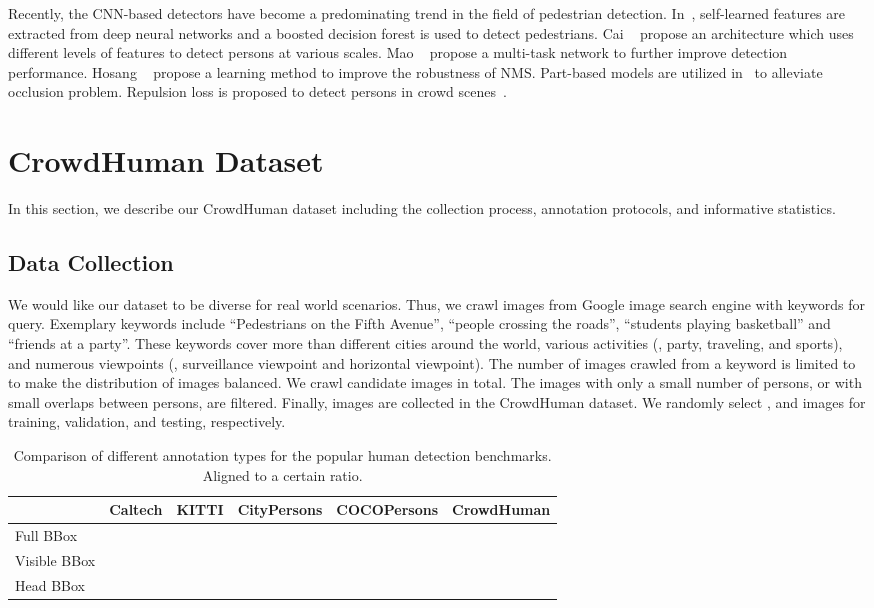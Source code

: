 \documentclass[10pt,twocolumn,letterpaper]{article}
\begin{document}
Recently, the CNN-based detectors have become a predominating trend in the field of pedestrian detection. In~\cite{zhang2016faster}, self-learned features are extracted from deep neural networks and a boosted decision forest is used to detect pedestrians. Cai \etal~\cite{cai2016unified} propose an architecture which uses different levels of features to detect persons at various scales. Mao \etal~\cite{mao2017can} propose a multi-task network to further improve detection performance. Hosang \etal~\cite{Hosang_2017_CVPR} propose a learning method to improve the robustness of NMS. Part-based models are utilized in~\cite{ouyang2012discriminative,zhou2017multi} to alleviate occlusion problem. Repulsion loss is proposed to detect persons in crowd scenes~\cite{wang2018Repulsion}.


\section{CrowdHuman Dataset}
\label{sec:dataset}
In this section, we describe our CrowdHuman dataset including the collection process, annotation protocols, and informative statistics.
\subsection{Data Collection}
We would like our dataset to be diverse for real world scenarios. Thus, we crawl images from Google image search engine with  keywords for query. Exemplary keywords include ``Pedestrians on the Fifth Avenue'', ``people crossing the roads'', ``students playing basketball'' and ``friends at a party''. These keywords cover more than  different cities around the world, various activities (\eg, party, traveling, and sports), and numerous viewpoints (\eg, surveillance viewpoint and horizontal viewpoint). The number of images crawled from a keyword is limited to  to make the distribution of images balanced. We crawl  candidate images in total. The images with only a small number of persons, or with small overlaps between persons, are filtered. Finally,  images are collected in the CrowdHuman dataset. We randomly select ,  and  images for training, validation, and testing, respectively. 



\begin{table*}[!t]
\centering
\begin{tabular}{l|ccccc}
\hline
\hline
 & Caltech & KITTI & CityPersons & COCOPersons & CrowdHuman \\
\hline
Full BBox &  &  &  &  & \\
Visible BBox &  &   &  &  &  \\
Head BBox &  &  &  &  &  \\
\hline
\end{tabular}
\caption{\label{tab:annotation_comparison} Comparison of different annotation types for the popular human detection benchmarks. Aligned to a certain ratio.}
\end{table*}
\end{document}
